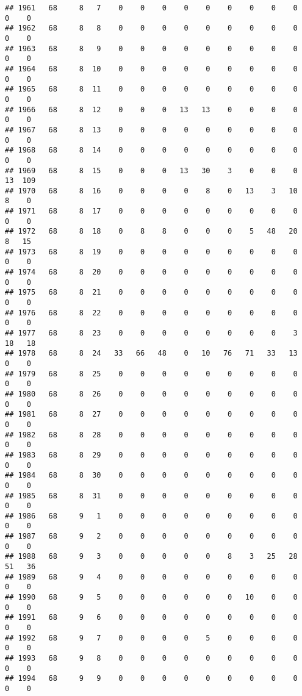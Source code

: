 \documentclass[]{article}
\begin{document}
\begin{verbatim}
## 1961   68     8   7    0    0    0    0    0    0    0    0    0    0    0
## 1962   68     8   8    0    0    0    0    0    0    0    0    0    0    0
## 1963   68     8   9    0    0    0    0    0    0    0    0    0    0    0
## 1964   68     8  10    0    0    0    0    0    0    0    0    0    0    0
## 1965   68     8  11    0    0    0    0    0    0    0    0    0    0    0
## 1966   68     8  12    0    0    0   13   13    0    0    0    0    0    0
## 1967   68     8  13    0    0    0    0    0    0    0    0    0    0    0
## 1968   68     8  14    0    0    0    0    0    0    0    0    0    0    0
## 1969   68     8  15    0    0    0   13   30    3    0    0    0   13  109
## 1970   68     8  16    0    0    0    0    8    0   13    3   10    8    0
## 1971   68     8  17    0    0    0    0    0    0    0    0    0    0    0
## 1972   68     8  18    0    8    8    0    0    0    5   48   20    8   15
## 1973   68     8  19    0    0    0    0    0    0    0    0    0    0    0
## 1974   68     8  20    0    0    0    0    0    0    0    0    0    0    0
## 1975   68     8  21    0    0    0    0    0    0    0    0    0    0    0
## 1976   68     8  22    0    0    0    0    0    0    0    0    0    0    0
## 1977   68     8  23    0    0    0    0    0    0    0    0    3   18   18
## 1978   68     8  24   33   66   48    0   10   76   71   33   13    0    0
## 1979   68     8  25    0    0    0    0    0    0    0    0    0    0    0
## 1980   68     8  26    0    0    0    0    0    0    0    0    0    0    0
## 1981   68     8  27    0    0    0    0    0    0    0    0    0    0    0
## 1982   68     8  28    0    0    0    0    0    0    0    0    0    0    0
## 1983   68     8  29    0    0    0    0    0    0    0    0    0    0    0
## 1984   68     8  30    0    0    0    0    0    0    0    0    0    0    0
## 1985   68     8  31    0    0    0    0    0    0    0    0    0    0    0
## 1986   68     9   1    0    0    0    0    0    0    0    0    0    0    0
## 1987   68     9   2    0    0    0    0    0    0    0    0    0    0    0
## 1988   68     9   3    0    0    0    0    0    8    3   25   28   51   36
## 1989   68     9   4    0    0    0    0    0    0    0    0    0    0    0
## 1990   68     9   5    0    0    0    0    0    0   10    0    0    0    0
## 1991   68     9   6    0    0    0    0    0    0    0    0    0    0    0
## 1992   68     9   7    0    0    0    0    5    0    0    0    0    0    0
## 1993   68     9   8    0    0    0    0    0    0    0    0    0    0    0
## 1994   68     9   9    0    0    0    0    0    0    0    0    0    0    0

\end{verbatim}
\end{document}
